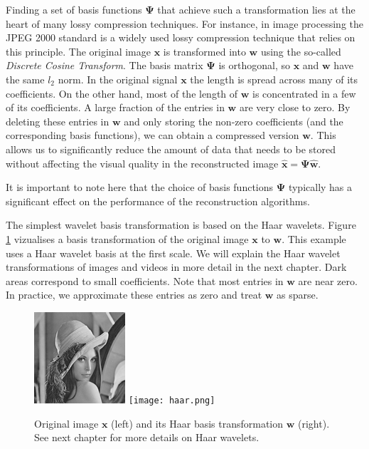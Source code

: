 \documentclass[final,3p]{report}
\let\bs\boldsymbol
\begin{document}
Finding a set of basis functions $\bs\Psi$ that achieve such a transformation lies at the heart of many lossy compression techniques.
For instance, in image processing the JPEG 2000 standard is a widely used lossy compression technique that relies on this principle.
The original image $\bs x$ is transformed into $\bs w$ using the so-called \emph{Discrete Cosine Transform}.
The basis matrix $\bs \Psi$ is orthogonal, so $\bs x$ and $\bs w$ have the same $l_2$ norm.
In the original signal $\bs x$ the length is spread across many of its coefficients.
On the other hand, most of the length of $\bs w$ is concentrated in a few of its coefficients.
A large fraction of the entries in $\bs w$ are very close to zero. 
By deleting these entries in $\bs w$ and only storing the non-zero coefficients (and the corresponding basis functions), we can obtain a compressed version $\hat{\bs w}$. 
This allows us to significantly reduce the amount of data that needs to be stored without affecting the visual quality in the reconstructed image $\hat{\bs x} = \bs\Psi\hat{\bs w}$.

It is important to note here that the choice of basis functions $\bs \Psi$ typically has a significant effect on the performance of the reconstruction algorithms.

The simplest wavelet basis transformation is based on the Haar wavelets.
Figure \ref{fig:haarlenna} vizualises a basis transformation of the original image $\bs x$ to $\bs w$. 
This example uses a Haar wavelet basis at the first scale.
We will explain the Haar wavelet transformations of images and videos in more detail in the next chapter.
Dark areas correspond to small coefficients.
Note that most entries in $\bs w$ are near zero. 
In practice, we approximate these entries as zero and treat $\bs w$ as sparse.

\begin{figure}
\label{fig:haarlenna}
\center
\includegraphics{128.png}
\texttt{[image: haar.png]}
\caption{Original image $\bs x$ (left) and its Haar basis transformation $\bs w$ (right). See next chapter for more details on Haar wavelets.}
\end{figure}
\end{document}
